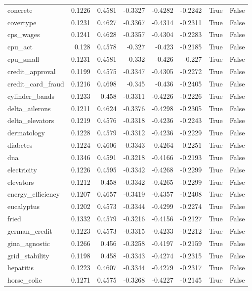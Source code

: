 \begin{table}
\begin{tabular}{lrrrrrrr}
concrete & 0.1226 & 0.4581 & -0.3327 & -0.4282 & -0.2242 & True & False \\
covertype & 0.1231 & 0.4627 & -0.3367 & -0.4314 & -0.2311 & True & False \\
cps\_wages & 0.1241 & 0.4628 & -0.3357 & -0.4304 & -0.2283 & True & False \\
cpu\_act & 0.128 & 0.4578 & -0.327 & -0.423 & -0.2185 & True & False \\
cpu\_small & 0.1231 & 0.4581 & -0.332 & -0.426 & -0.227 & True & False \\
credit\_approval & 0.1199 & 0.4575 & -0.3347 & -0.4305 & -0.2272 & True & False \\
credit\_card\_fraud & 0.1216 & 0.4698 & -0.345 & -0.436 & -0.2405 & True & False \\
cylinder\_bands & 0.1233 & 0.458 & -0.3311 & -0.4226 & -0.2226 & True & False \\
delta\_ailerons & 0.1211 & 0.4624 & -0.3376 & -0.4298 & -0.2305 & True & False \\
delta\_elevators & 0.1219 & 0.4576 & -0.3318 & -0.4236 & -0.2243 & True & False \\
dermatology & 0.1228 & 0.4579 & -0.3312 & -0.4236 & -0.2229 & True & False \\
diabetes & 0.1224 & 0.4606 & -0.3343 & -0.4264 & -0.2251 & True & False \\
dna & 0.1346 & 0.4591 & -0.3218 & -0.4166 & -0.2193 & True & False \\
electricity & 0.1226 & 0.4595 & -0.3342 & -0.4268 & -0.2299 & True & False \\
elevators & 0.1212 & 0.458 & -0.3342 & -0.4265 & -0.2299 & True & False \\
energy\_efficiency & 0.1207 & 0.4657 & -0.3419 & -0.4357 & -0.2408 & True & False \\
eucalyptus & 0.1202 & 0.4573 & -0.3344 & -0.4299 & -0.2274 & True & False \\
fried & 0.1332 & 0.4579 & -0.3216 & -0.4156 & -0.2127 & True & False \\
german\_credit & 0.1223 & 0.4573 & -0.3315 & -0.4233 & -0.2212 & True & False \\
gina\_agnostic & 0.1266 & 0.456 & -0.3258 & -0.4197 & -0.2159 & True & False \\
grid\_stability & 0.1198 & 0.458 & -0.3343 & -0.4274 & -0.2315 & True & False \\
hepatitis & 0.1223 & 0.4607 & -0.3344 & -0.4279 & -0.2317 & True & False \\
horse\_colic & 0.1271 & 0.4575 & -0.3268 & -0.4227 & -0.2145 & True & False \\

\end{tabular}
\end{table}
